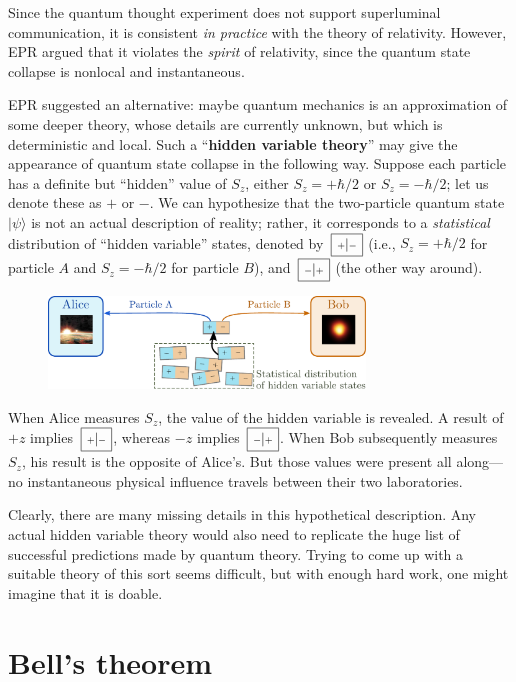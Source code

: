 \documentclass[pra,12pt]{revtex4-2}
\def\hvbox[#1]#2{\,\boxed{\scalebox{0.7}{$\,#1$}|\scalebox{0.7}{$#2\,$}}}
\begin{document}
Since the quantum thought experiment does not support superluminal
communication, it is consistent \textit{in practice} with the theory
of relativity.  However, EPR argued that it violates the
\textit{spirit} of relativity, since the quantum state collapse is
nonlocal and instantaneous.

EPR suggested an alternative: maybe quantum mechanics is an
approximation of some deeper theory, whose details are currently
unknown, but which is deterministic and local.  Such a
``\textbf{hidden variable theory}'' may give the appearance of quantum
state collapse in the following way.  Suppose each particle has a
definite but ``hidden'' value of $S_z$, either $S_z = +\hbar/2$ or
$S_z = -\hbar/2$; let us denote these as $+$ or $-$.  We can
hypothesize that the two-particle quantum state $|\psi\rangle$ is not
an actual description of reality; rather, it corresponds to a
\textit{statistical} distribution of ``hidden variable'' states,
denoted by $\hvbox[+]{-}$ (i.e., $S_z = +\hbar/2$ for particle $A$ and
$S_z = -\hbar/2$ for particle $B$), and $\hvbox[-]{+}$ (the other way
around).

\begin{figure}[h]
  \centering\includegraphics[width=0.75\textwidth]{hiddenvariables}
\end{figure}

When Alice measures $S_z$, the value of the hidden variable is
revealed.  A result of $+z$ implies $\hvbox[+]{-}$, whereas $-z$
implies $\hvbox[-]{+}$.  When Bob subsequently measures $S_z$, his
result is the opposite of Alice's.  But those values were present all
along---no instantaneous physical influence travels between their two
laboratories.

Clearly, there are many missing details in this hypothetical
description.  Any actual hidden variable theory would also need to
replicate the huge list of successful predictions made by quantum
theory.  Trying to come up with a suitable theory of this sort seems
difficult, but with enough hard work, one might imagine that it is
doable.

\section{Bell's theorem}
\label{sec:bell}
\end{document}
